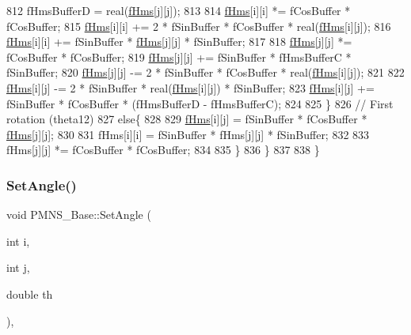 \begin{DoxyCode}
812       fHmsBufferD = real(\hyperlink{classOscProb_1_1PMNS__Base_adf5901166216e8c7a5cff2092952f473}{fHms}[j][j]);
813 
814       \hyperlink{classOscProb_1_1PMNS__Base_adf5901166216e8c7a5cff2092952f473}{fHms}[i][i] *= fCosBuffer * fCosBuffer;
815       \hyperlink{classOscProb_1_1PMNS__Base_adf5901166216e8c7a5cff2092952f473}{fHms}[i][i] += 2 * fSinBuffer * fCosBuffer * real(\hyperlink{classOscProb_1_1PMNS__Base_adf5901166216e8c7a5cff2092952f473}{fHms}[i][j]);
816       \hyperlink{classOscProb_1_1PMNS__Base_adf5901166216e8c7a5cff2092952f473}{fHms}[i][i] += fSinBuffer * \hyperlink{classOscProb_1_1PMNS__Base_adf5901166216e8c7a5cff2092952f473}{fHms}[j][j] * fSinBuffer;
817 
818       \hyperlink{classOscProb_1_1PMNS__Base_adf5901166216e8c7a5cff2092952f473}{fHms}[j][j] *= fCosBuffer * fCosBuffer;
819       \hyperlink{classOscProb_1_1PMNS__Base_adf5901166216e8c7a5cff2092952f473}{fHms}[j][j] += fSinBuffer * fHmsBufferC * fSinBuffer;
820       \hyperlink{classOscProb_1_1PMNS__Base_adf5901166216e8c7a5cff2092952f473}{fHms}[j][j] -= 2 * fSinBuffer * fCosBuffer * real(\hyperlink{classOscProb_1_1PMNS__Base_adf5901166216e8c7a5cff2092952f473}{fHms}[i][j]);
821 
822       \hyperlink{classOscProb_1_1PMNS__Base_adf5901166216e8c7a5cff2092952f473}{fHms}[i][j] -= 2 * fSinBuffer * real(\hyperlink{classOscProb_1_1PMNS__Base_adf5901166216e8c7a5cff2092952f473}{fHms}[i][j]) * fSinBuffer;
823       \hyperlink{classOscProb_1_1PMNS__Base_adf5901166216e8c7a5cff2092952f473}{fHms}[i][j] += fSinBuffer * fCosBuffer * (fHmsBufferD - fHmsBufferC);
824 
825     \}
826     \textcolor{comment}{// First rotation (theta12)}
827     \textcolor{keywordflow}{else}\{
828 
829       \hyperlink{classOscProb_1_1PMNS__Base_adf5901166216e8c7a5cff2092952f473}{fHms}[i][j] = fSinBuffer * fCosBuffer * \hyperlink{classOscProb_1_1PMNS__Base_adf5901166216e8c7a5cff2092952f473}{fHms}[j][j];
830 
831       fHms[i][i] = fSinBuffer * fHms[j][j] * fSinBuffer;
832 
833       fHms[j][j] *= fCosBuffer * fCosBuffer;
834 
835     \}
836   \}
837 
838 \}
\end{DoxyCode}
\mbox{\label{classOscProb_1_1PMNS__Base_ace7875cf6d3bec161a2b7ed2690aec34}} 
\subsubsection{\texorpdfstring{Set\+Angle()}{SetAngle()}}
{\footnotesize\ttfamily void P\+M\+N\+S\+\_\+\+Base\+::\+Set\+Angle (\begin{DoxyParamCaption}\item[{int}]{i,  }\item[{int}]{j,  }\item[{double}]{th }\end{DoxyParamCaption})\hspace{0.3cm}{\ttfamily [virtual]}, {\ttfamily [inherited]}}

